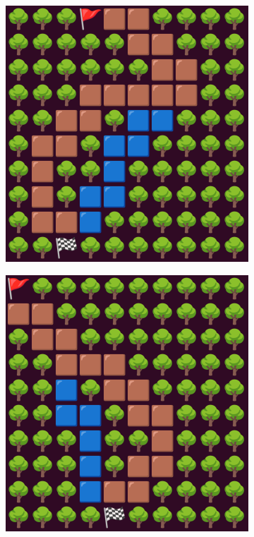 \documentclass{article}
\begin{document}
\begin{figure}[!h]
    \centering
    \begin{subfigure}{0.3\textwidth}
    \centering
        \includegraphics[width=\textwidth]{world1.png}
    \end{subfigure}
    \hfill
    \begin{subfigure}{0.3\textwidth}
        \includegraphics[width=\textwidth]{world2.png}

\end{subfigure}
\end{figure}
\end{document}
